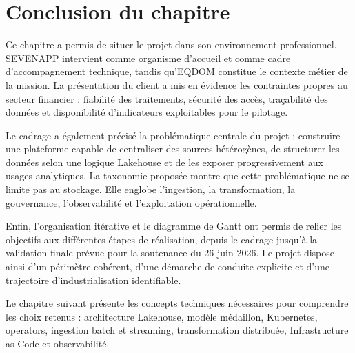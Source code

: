 \section*{Conclusion du chapitre}

Ce chapitre a permis de situer le projet dans son environnement professionnel. SEVENAPP intervient comme organisme d'accueil et comme cadre d'accompagnement technique, tandis qu'EQDOM constitue le contexte métier de la mission. La présentation du client a mis en évidence les contraintes propres au secteur financier : fiabilité des traitements, sécurité des accès, traçabilité des données et disponibilité d'indicateurs exploitables pour le pilotage.

Le cadrage a également précisé la problématique centrale du projet : construire une plateforme capable de centraliser des sources hétérogènes, de structurer les données selon une logique Lakehouse et de les exposer progressivement aux usages analytiques. La taxonomie proposée montre que cette problématique ne se limite pas au stockage. Elle englobe l'ingestion, la transformation, la gouvernance, l'observabilité et l'exploitation opérationnelle.

Enfin, l'organisation itérative et le diagramme de Gantt ont permis de relier les objectifs aux différentes étapes de réalisation, depuis le cadrage jusqu'à la validation finale prévue pour la soutenance du 26 juin 2026. Le projet dispose ainsi d'un périmètre cohérent, d'une démarche de conduite explicite et d'une trajectoire d'industrialisation identifiable.

Le chapitre suivant présente les concepts techniques nécessaires pour comprendre les choix retenus : architecture Lakehouse, modèle médaillon, Kubernetes, operators, ingestion batch et streaming, transformation distribuée, Infrastructure as Code et observabilité.

\clearpage
